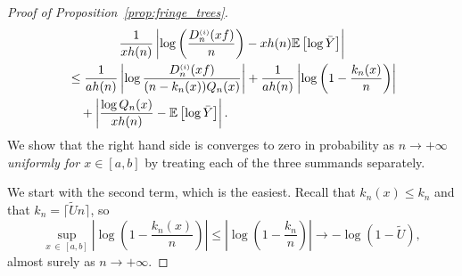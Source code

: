 \documentclass[AHL,Unicode,longabstracts,published]{cedram}
\newcommand{\sss}{\ensuremath{\scriptscriptstyle}}
\newcommand{\bbE}{\mathbb{E}}
\begin{document}
\begin{proof}[Proof of Proposition~\ref{prop:fringe_trees}]
\begin{multline}\label{eq:three_terms}
\frac1{xh(n)}\left|\log \left(\frac{D_n^{\sss (i)}(xf)}n\right)-xh(n)\bbE\left[\log \bar Y\right]\right|
\\
\begin{aligned}
&\leq \frac1{ah(n)}\left|\log \frac{D_n^{\sss (i)}(xf)}{(n-k_n(x))Q_n(x)}\right| +\frac1{ah(n)}\left|\log\left(1-\frac{k_n(x)}n\right)\right|\\
&\quad+\left|\frac{\log Q_n(x)}{xh(n)}-\bbE\left[\log \bar Y\right]\right|.
\end{aligned}
\end{multline}
We show that the right hand side is converges to zero in probability as $n\to+\infty$ \emph{uniformly for $x\in[a,b]$} by treating each of the three summands separately.

We start with the second term, which is the easiest. Recall that $k_n(x)\leq k_n$ and that $k_n = \lceil \widetilde Un\rceil$, so
\begin{equation}\label{eq:1st}
\sup_{x\,\in\,[a,b]}\left|\log\left(1-\frac{k_n(x)}n\right)\right| \leq \left|\log\left(1-\frac{k_n}n\right)\right|
\to -\log (1-\widetilde U),
\end{equation}
almost surely as $n\to+\infty$.


\end{proof}
\end{document}
